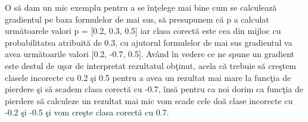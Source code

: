 O s\u{a} dam un mic exemplu pentru a se \^{i}n\c{t}elege mai bine cum se calculeaz\u{a} gradientul pe baza formulelor de mai sus, s\u{a} presupunem c\u{a} p a calculat urm\u{a}toarele valori p = [0.2, 0.3, 0.5] iar clasa corect\u{a} este cea din mijloc cu probabilitatea atribuit\u{a} de 0.3, cu ajutorul formulelor de mai sus gradientul va avea urm\u{a}toarile valori [0.2, -0.7, 0.5]. Av\^{a}nd \^{i}n vedere ce ne spune un gradient este destul de u\c{s}or de interpretat rezultatul ob\c{t}inut, acela c\u{a} trebuie s\u{a} cre\c{s}tem clasele incorecte cu 0.2 \c{s}i 0.5 pentru a avea un rezultat mai mare la func\c{t}ia de pierdere \c{s}i s\u{a} scadem clasa corect\u{a} cu -0.7, \^{i}ns\u{a} pentru ca noi dorim ca func\c{t}ia de pierdere s\u{a} calculeze un rezultat mai mic vom scade cele do\u{a} clase incorecte cu -0.2 \c{s}i -0.5 \c{s}i vom cre\c{s}te clasa corect\u{a} cu 0.7.